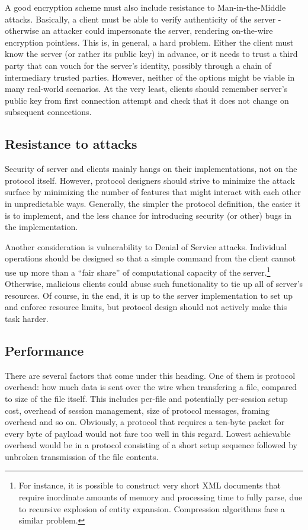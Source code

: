 A good encryption scheme must also include resistance to Man-in-the-Middle attacks. Basically, a client must
be able to verify authenticity of the server - otherwise an attacker could impersonate the server, rendering
on-the-wire encryption pointless. This is, in general, a hard problem. Either the client must know the server
(or rather its public key) in advance, or it needs to trust a third party that can vouch for the server's
identity, possibly through a chain of intermediary trusted parties. However, neither of the options might be
viable in many real-world scenarios. At the very least, clients should remember server's public key from first
connection attempt and check that it does not change on subsequent connections.

\subsection{Resistance to attacks}

Security of server and clients mainly hangs on their implementations, not on the protocol itself. However,
protocol designers should strive to minimize the attack surface by minimizing the number of features that
might interact with each other in unpredictable ways. Generally, the simpler the protocol definition, the
easier it is to implement, and the less chance for introducing security (or other) bugs in the implementation.

Another consideration is vulnerability to Denial of Service attacks. Individual operations should be designed
so that a simple command from the client cannot use up more than a ``fair share'' of computational capacity of
the server.\footnote{For instance, it is possible to construct very short XML documents that require
inordinate amounts of memory and processing time to fully parse, due to recursive explosion of entity
expansion. Compression algorithms face a similar problem.} Otherwise, malicious clients could abuse such
functionality to tie up all of server's resources. Of course, in the end, it is up to the server
implementation to set up and enforce resource limits, but protocol design should not actively make this task
harder.

\subsection{Performance}

There are several factors that come under this heading. One of them is protocol overhead: how much data is
sent over the wire when transfering a file, compared to size of the file itself.  This includes per-file and
potentially per-session setup cost, overhead of session management, size of protocol messages, framing
overhead and so on. Obviously, a protocol that requires a ten-byte packet for every byte of payload would not
fare too well in this regard. Lowest achievable overhead would be in a protocol consisting of a short setup
sequence followed by unbroken transmission of the file contents.

